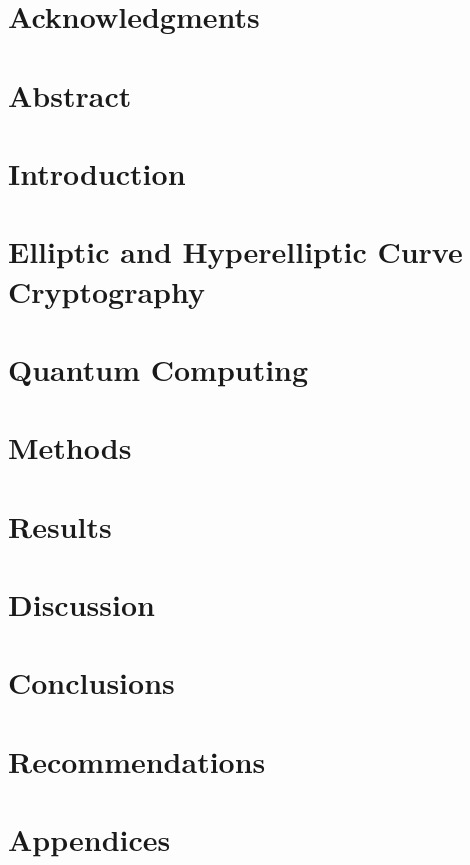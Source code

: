 \documentclass[10pt]{article}
\begin{document}

\restoregeometry

\section{Acknowledgments}

\pagebreak

\setcounter{tocdepth}{5}
\tableofcontents
\pagebreak

\listoffigures
\listoftables
\pagebreak

\justify

\section*{Abstract}

\pagebreak

\section{Introduction}


\section{Elliptic and Hyperelliptic Curve Cryptography}


\section{Quantum Computing}


\section{Methods}


\section{Results}


\section{Discussion}


\section{Conclusions}


\section{Recommendations}


\pagebreak
\section{Appendices}


\pagebreak


\end{document}
